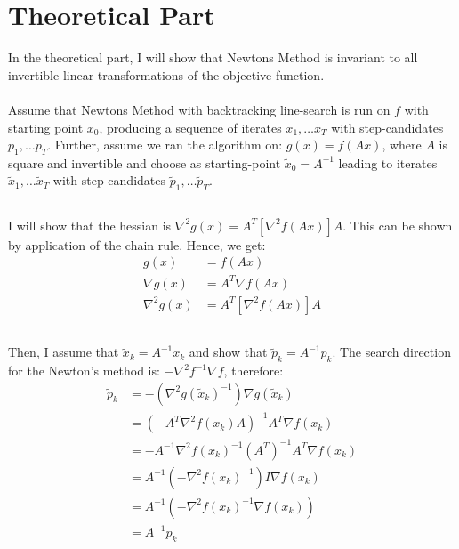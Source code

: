 \documentclass[a4paper]{article}
\begin{document}
\section{Theoretical Part}
In the theoretical part, I will show that Newtons
Method is invariant to all invertible linear transformations of the objective
function.\\\\
Assume that Newtons Method with backtracking line-search is run on $f$ with starting point
$x_0$, producing a sequence of iterates $x_1, \dots x_T$
with step-candidates $p_1, \dots p_T$. Further, assume we
ran the algorithm on: $g(x)=f(Ax)$, where $A$ is
square and invertible and choose as starting-point $\tilde{x}_0= A^{-1}$
leading to iterates $\tilde{x}_1, \dots \tilde{x}_T$ with step candidates
$\tilde{p}_1, \dots \tilde{p}_T$.

\subsection{}
I will show that the hessian is $\nabla^2 g(x)= A^T \left[\nabla^2 f(Ax)\right] A$. This can be shown
by application of the chain rule. Hence, we get:
\begin{align*}
 g(x) &= f(Ax)\\
 \nabla g(x) &= A^T \nabla f(Ax)\\
 \nabla^2 g(x) &= A^T \left[\nabla^2 f(Ax)\right]A
\end{align*}

\subsection{}
Then, I assume that $\tilde{x}_k= A^{-1} x_k$ and show that
$\tilde{p}_k=A^{-1}p_k$. The search direction for the Newton's method is:
$-\nabla^{2}f^{-1}\nabla f$, therefore:
\[
\begin{aligned}
  \tilde{p}_{k} &=-(\nabla^{2} g\left(\tilde{x}_{k}\right)^{-1}) \nabla g\left(\tilde{x}_{k}\right) \\
  &=\left(-A^T \nabla^{2} f\left(x_{k}\right) A\right)^{-1} A^T \nabla f\left(x_{k}\right) \\
  &=-A^{-1} \nabla^{2} f\left(x_{k}\right)^{-1} (A^T)^{-1} A^T \nabla f\left(x_{k}\right) \\
  &=A^{-1}(- \nabla^{2} f\left(x_{k}\right)^{-1}) I \nabla f\left(x_{k}\right) \\
  &=A^{-1}\left(-\nabla^{2} f\left(x_{k}\right)^{-1} \nabla f\left(x_{k}\right)\right) \\
  &=A^{-1} p_{k}
\end{aligned}
\]
\end{document}
